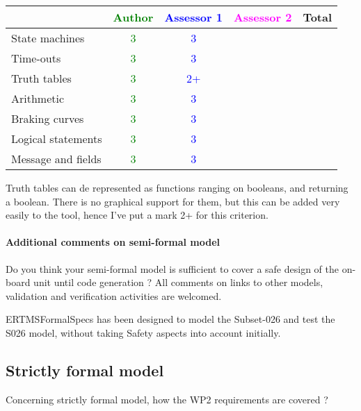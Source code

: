 \begin{tabular}{|l | c | c | c | c|}
\hline
& \textcolor{green}{Author} & \textcolor{blue}{Assessor 1} & \textcolor{magenta}{Assessor 2} & Total \\
\hline 
State machines  & \textcolor{green}{3} & \textcolor{blue}{3} & &  \\
\hline
Time-outs  & \textcolor{green}{3} & \textcolor{blue}{3} & &  \\
\hline
Truth tables  & \textcolor{green}{3} & \textcolor{blue}{2+} & &  \\
\hline
Arithmetic  & \textcolor{green}{3} & \textcolor{blue}{3} & &  \\
\hline
Braking curves  & \textcolor{green}{3} & \textcolor{blue}{3} & &  \\
\hline
Logical statements & \textcolor{green}{3} & \textcolor{blue}{3} & &  \\
\hline
Message and fields & \textcolor{green}{3} & \textcolor{blue}{3} & &  \\
\hline
\end{tabular}

\begin{assessor1}
Truth tables can de represented as functions ranging on booleans, and returning a boolean. There is no graphical support for them, but this can be added very easily to the tool, hence I've put a mark 2+ for this criterion. 
\end{assessor1}

\paragraph{Additional comments on semi-formal  model} Do you think your semi-formal  model is sufficient to cover a safe design of the on-board unit until code generation ?
All comments on links to  other models, validation and verification activities are welcomed.

\begin{author_comment}
ERTMSFormalSpecs has been designed to model the Subset-026 and test the S026 model, without taking Safety aspects into account initially.    
\end{author_comment}
\subsection{Strictly formal model}

Concerning strictly formal model, how the WP2 requirements are covered ?

